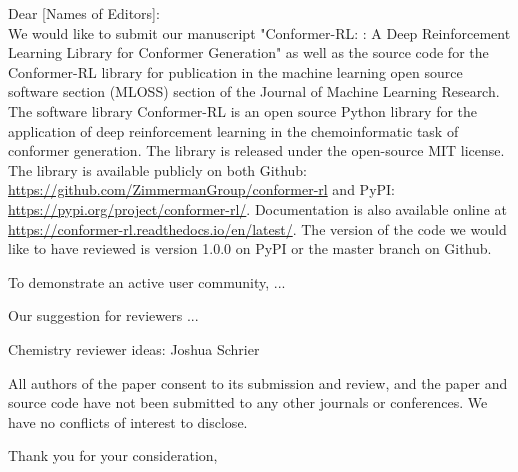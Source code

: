\documentclass[twoside,11pt]{article}
\begin{document}
    \noindent Dear [Names of Editors]: \\
    
    We would like to submit our manuscript "Conformer-RL: : A Deep Reinforcement Learning Library for Conformer Generation" as well as the source code for the Conformer-RL library for publication in the machine learning open source software section (MLOSS) section of the Journal of Machine Learning Research. The software library Conformer-RL is an open source Python library for the application of deep reinforcement learning in the chemoinformatic task of conformer generation. The library is released under the open-source MIT license. The library is available publicly on both Github: \url{https://github.com/ZimmermanGroup/conformer-rl} and PyPI: \url{https://pypi.org/project/conformer-rl/}. Documentation is also available online at \url{https://conformer-rl.readthedocs.io/en/latest/}. The version of the code we would like to have reviewed is version 1.0.0 on PyPI or the master branch on Github.
    
    \medskip

    
    To demonstrate an active user community, ...
    
    \medskip
    
    Our suggestion for reviewers ...
    
    Chemistry reviewer ideas:
    Joshua Schrier
    
    
    \medskip
    
    All authors of the paper consent to its submission and review, and the paper and source code have not been submitted to any other journals or conferences. We have no conflicts of interest to disclose.
    
    \medskip
    
    \noindent Thank you for your consideration,
    
    \medskip
    
    
\end{document}
